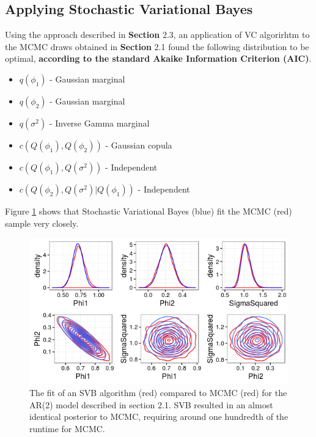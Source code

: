 \documentclass[12pt,a4paper]{article}%
\numberwithin{equation}{section}
\begin{document}
\subsection{Applying Stochastic Variational Bayes}

Using the approach described in {\bf Section} 2.3,
an application of VC algorirhtm to the MCMC draws obtained in {\bf Section} 2.1 %
found the following distribution to be optimal, {\bf according to the standard Akaike Information Criterion (AIC)}.

\begin{itemize}
\item $q(\phi_1)$ - Gaussian marginal
\item $q(\phi_2)$ - Gaussian marginal
\item $q(\sigma^2)$ - Inverse Gamma marginal
\item $c(Q(\phi_1), Q(\phi_2))$ - Gaussian copula
\item $c(Q(\phi_1), Q(\sigma^2))$ - Independent
\item $c(Q(\phi_2), Q(\sigma^2) | Q(\phi_1))$ - Independent
\end{itemize}

Figure \ref{VBfit} shows that Stochastic Variational Bayes (blue) fit the MCMC (red) sample very closely.

\begin{figure}[h]
\centering
\includegraphics[scale = 0.5]{VBfit.png}
\caption{The fit of an SVB algorithm (red) compared to MCMC (red) for the AR(2) model described in section 2.1. SVB resulted in an almost identical posterior to MCMC, requiring around one hundredth of the runtime for MCMC.}
\label{VBfit}
\end{figure}
\end{document}
